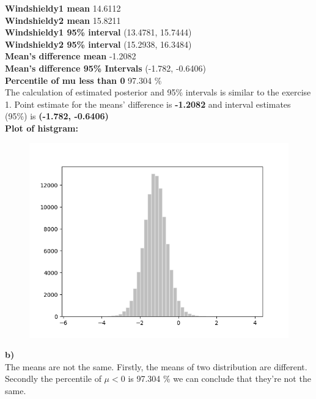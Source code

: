 \documentclass{article}
\begin{document}
\textbf{Windshieldy1 mean} 14.6112\\
\textbf{Windshieldy2 mean} 15.8211\\
\textbf{Windshieldy1 95\% interval} (13.4781, 15.7444)\\
\textbf{Windshieldy2 95\% interval} (15.2938, 16.3484)\\
\textbf{Mean's difference mean} -1.2082\\
\textbf{Mean's difference 95\% Intervals} (-1.782, -0.6406)\\
\textbf{Percentile of mu less than 0} 97.304 \%\\

The calculation of estimated posterior and 95\% intervals is similar to the exercise 1. Point estimate for the means' difference is \textbf{-1.2082} and interval estimates (95\%) is \textbf{(-1.782, -0.6406)}  \\

\textbf{Plot of histgram:}
\begin{figure}[H]
\centering  
\includegraphics[scale=0.5]{3.png}
\label{Fig}
\end{figure}

\textbf{b)}\\
The means are not the same. Firstly, the means of two distribution are different. Secondly the percentile of $\mu<0$ is 97.304 \% we can conclude that they're not the same.
\end{document}
